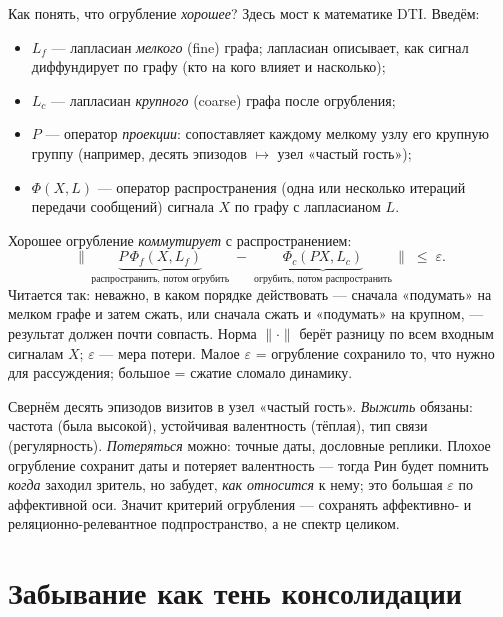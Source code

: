 Как понять, что огрубление \emph{хорошее}? Здесь мост к математике DTI. Введём:
\begin{itemize}\itemsep1pt
\item $L_f$ — лапласиан \emph{мелкого} (fine) графа; лапласиан описывает, как сигнал
диффундирует по графу (кто на кого влияет и насколько);
\item $L_c$ — лапласиан \emph{крупного} (coarse) графа после огрубления;
\item $P$ — оператор \emph{проекции}: сопоставляет каждому мелкому узлу его крупную
группу (например, десять эпизодов $\mapsto$ узел «частый гость»);
\item $\Phi(X,L)$ — оператор распространения (одна или несколько итераций передачи
сообщений) сигнала $X$ по графу с лапласианом $L$.
\end{itemize}
Хорошее огрубление \emph{коммутирует} с распространением:
\begin{equation}
\big\|\,\underbrace{P\,\Phi_f(X,L_f)}_{\text{распространить, потом огрубить}}
\;-\;\underbrace{\Phi_c(PX,L_c)}_{\text{огрубить, потом распространить}}\,\big\|
\;\le\;\varepsilon .
\label{eq:commute}
\end{equation}
Читается так: неважно, в каком порядке действовать — сначала «подумать» на мелком
графе и затем сжать, или сначала сжать и «подумать» на крупном, — результат должен
почти совпасть. Норма $\|\cdot\|$ берёт разницу по всем входным сигналам $X$;
$\varepsilon$ — мера потери. Малое $\varepsilon$ = огрубление сохранило то, что нужно
для рассуждения; большое = сжатие сломало динамику.

\begin{workedbox}
Свернём десять эпизодов визитов в узел «частый гость». \emph{Выжить} обязаны:
частота (была высокой), устойчивая валентность (тёплая), тип связи (регулярность).
\emph{Потеряться} можно: точные даты, дословные реплики. Плохое огрубление сохранит
даты и потеряет валентность — тогда Рин будет помнить \emph{когда} заходил зритель,
но забудет, \emph{как относится} к нему; это большая $\varepsilon$ по аффективной
оси. Значит критерий огрубления — сохранять аффективно- и реляционно-релевантное
подпространство, а не спектр целиком.
\end{workedbox}

\section{Забывание как тень консолидации}
\label{sec:decay}

